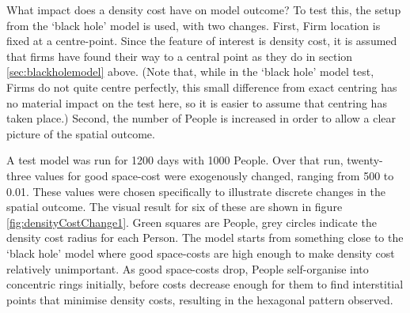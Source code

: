 What impact does a density cost have on model outcome? To test this, the setup from the `black hole' model is used, with two changes. First, Firm location is fixed at a centre-point. Since the feature of interest is density cost, it is assumed that firms have found their way to a central point as they do in section \ref{sec:blackholemodel} above. (Note that, while in the `black hole' model test, Firms do not quite centre perfectly, this small difference from exact centring has no material impact on the test here, so it is easier to assume that centring has taken place.) Second, the number of People is increased in order to allow a clear picture of the spatial outcome.


A test model was run for 1200 days with 1000 People. Over that run, twenty-three values for good space-cost were exogenously changed, ranging from 500 to 0.01. These values were chosen specifically to illustrate discrete changes in the spatial outcome. The visual result for six of these are shown in figure \ref{fig:densityCostChange1}. Green squares are People, grey circles indicate the density cost radius for each Person. The model starts from something close to the `black hole' model where good space-costs are high enough to make density cost relatively unimportant. As good space-costs drop, People self-organise into concentric rings initially, before costs decrease enough for them to find interstitial points that minimise density costs, resulting in the hexagonal pattern observed. 

